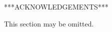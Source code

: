 \begin{acknowledgements}
	***ACKNOWLEDGEMENTS***

	This section may be omitted.
\end{acknowledgements}
